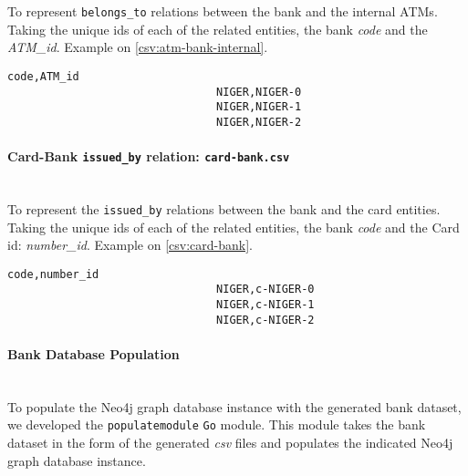 To represent \texttt{belongs\_to} relations between the bank and the internal ATMs. Taking the unique ids of each of the related entities, the bank \emph{code} and the \emph{ATM\_id}. Example on \ref{csv:atm-bank-internal}.

\begin{center}
\lstset{style=csvStyle}
\begin{lstlisting}[caption={Example of a atm-bank-internal.csv}, label={csv:atm-bank-internal}]
                                code,ATM_id
                                NIGER,NIGER-0
                                NIGER,NIGER-1
                                NIGER,NIGER-2
\end{lstlisting}
\end{center}

\paragraph{Card-Bank \texttt{issued\_by} relation: \texttt{card-bank.csv}\\\\}

To represent the \texttt{issued\_by} relations between the bank and the card entities. Taking the unique ids of each of the related entities, the bank \emph{code} and the Card id: \emph{number\_id}. Example on \ref{csv:card-bank}.

\begin{center}
\lstset{style=csvStyle}
\begin{lstlisting}[caption={Example of a card-bank.csv}, label={csv:card-bank}]
                                code,number_id
                                NIGER,c-NIGER-0
                                NIGER,c-NIGER-1
                                NIGER,c-NIGER-2
\end{lstlisting}
\end{center}

\paragraph{Bank Database Population\\\\}

To populate the Neo4j graph database instance with the generated bank dataset, we developed the \texttt{populatemodule} \texttt{Go} module. This module takes the bank dataset in the form of the generated \emph{csv} files and populates the indicated Neo4j graph database instance.\\

